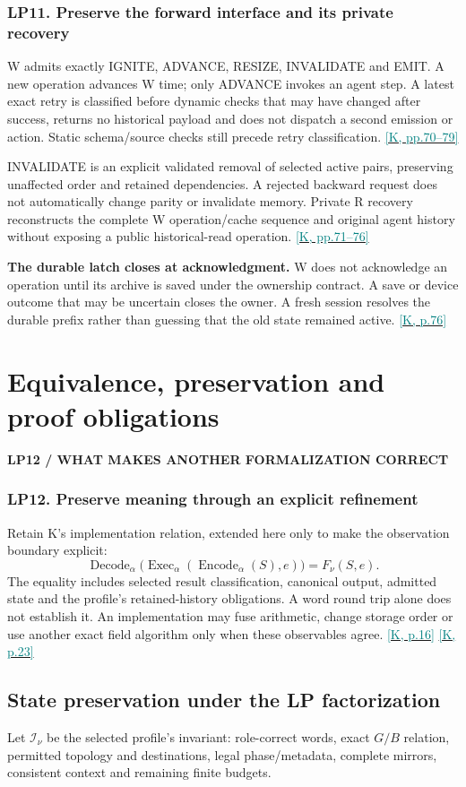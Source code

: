 \documentclass[11pt,a4paper]{article}
\newcommand{\kref}[1]{\hyperlink{baseline.#1}{\textcolor{teal}{[K, p.#1]}}}
\newcommand{\krange}[2]{\hyperlink{baseline.#1}{\textcolor{teal}{[K, pp.#1--#2]}}}
\newcommand{\status}[1]{{\sffamily\bfseries\scriptsize\color{teal}#1}\par}
\newcommand{\req}[2]{\subsubsection{#1. #2}}
\newcommand{\sectionstart}[1]{\par\addvspace{18pt}\Needspace{12\baselineskip}\section{#1}}
\theoremstyle{lpstyle}
\newcommand{\Inv}{\mathcal I}
\begin{document}
\req{LP11}{Preserve the forward interface and its private recovery}
W admits exactly IGNITE, ADVANCE, RESIZE, INVALIDATE and EMIT. A new operation advances W time; only ADVANCE invokes an agent step. A latest exact retry is classified before dynamic checks that may have changed after success, returns no historical payload and does not dispatch a second emission or action. Static schema/source checks still precede retry classification. \krange{70}{79}

INVALIDATE is an explicit validated removal of selected active pairs, preserving unaffected order and retained dependencies. A rejected backward request does not automatically change parity or invalidate memory. Private R recovery reconstructs the complete W operation/cache sequence and original agent history without exposing a public historical-read operation. \krange{71}{76}

\begin{principle}
\textbf{The durable latch closes at acknowledgment.} W does not acknowledge an operation until its archive is saved under the ownership contract. A save or device outcome that may be uncertain closes the owner. A fresh session resolves the durable prefix rather than guessing that the old state remained active. \kref{76}
\end{principle}

\sectionstart{Equivalence, preservation and proof obligations}
\status{LP12 / WHAT MAKES ANOTHER FORMALIZATION CORRECT}
\req{LP12}{Preserve meaning through an explicit refinement}
Retain K's implementation relation, extended here only to make the observation boundary explicit:
\[
\operatorname{Decode}_\alpha\!\bigl(\operatorname{Exec}_\alpha(
\operatorname{Encode}_\alpha(S),e)\bigr)=F_\nu(S,e).
\]
The equality includes selected result classification, canonical output, admitted state and the profile's retained-history obligations. A word round trip alone does not establish it. An implementation may fuse arithmetic, change storage order or use another exact field algorithm only when these observables agree. \kref{16} \kref{23}

\subsection{State preservation under the LP factorization}
Let $\Inv_\nu$ be the selected profile's invariant: role-correct words, exact $G/B$ relation, permitted topology and destinations, legal phase/metadata, complete mirrors, consistent context and remaining finite budgets.
\end{document}
